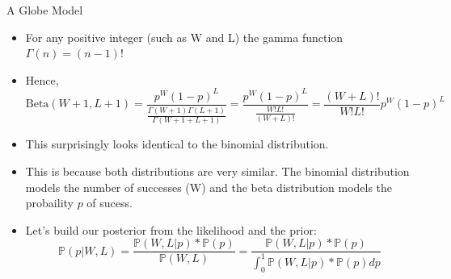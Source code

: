 \documentclass[handout]{beamer}
\begin{document}
\begin{frame}{A Globe Model}
\scriptsize{

\begin{itemize}
\item For any positive integer (such as W and L) the gamma function $\Gamma(n) = (n-1)!$

\item Hence, \begin{displaymath}
\text{Beta}(W+1 , L+1) = \frac{p^W(1-p)^L}{\frac{\Gamma(W+1)\Gamma(L+1)}{\Gamma(W+1 + L+1)}} = \frac{p^W(1-p)^L}{\frac{W!L!}{(W+L)!}} = \frac{(W+L)!}{W!L!}p^W(1-p)^L
\end{displaymath}

\item This surprisingly looks identical to the binomial distribution.

\item This is because both distributions are very similar. The binomial distribution models the number of successes (W) and the beta distribution models the probaility $p$ of sucess. 


\item Let's build our posterior from the likelihood and the prior:
\begin{displaymath}
\mathbb{P}(p|W,L) = \frac{\mathbb{P}(W,L|p)*\mathbb{P}(p)}{\mathbb{P}(W,L)} = \frac{\mathbb{P}(W,L|p)*\mathbb{P}(p)}{\int_0^1\mathbb{P}(W,L|p)*\mathbb{P}(p)dp} 
\end{displaymath}

\end{itemize}

} 

\end{frame}
\end{document}
